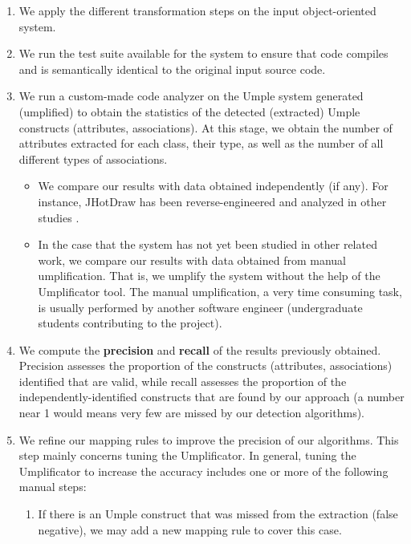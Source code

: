 \begin{enumerate}
\item We apply the different transformation steps on the input object-oriented system.

\item We run the test suite available for the system to ensure that code compiles and is semantically identical to the original input source code.

\item We run a custom-made code analyzer on the Umple system generated (umplified) to obtain the statistics of the detected (extracted) Umple constructs (attributes, associations). At this stage, we obtain the number of attributes extracted for each class, their type, as well as the number of all different types of associations.	

	\begin{itemize}
		\item We compare our results with data obtained independently (if any). For instance, JHotDraw has been reverse-engineered and analyzed in other studies \cite{Gueheneuc}. 
		
		\item In the case that the system has not yet been studied in other related work, we 				compare our results with data obtained from manual umplification. That is, we umplify the system without the help of the Umplificator tool. The manual 	umplification, a very time consuming task, is usually performed by another software engineer (undergraduate 			students contributing to the project).
	\end{itemize}
	
\item We compute the \textbf{precision} and \textbf{recall} of the results previously obtained. Precision assesses the proportion of the constructs (attributes, associations) identified that are valid, while recall assesses the proportion of the independently-identified constructs that are found by our approach (a number near 1 would means very few are missed by our detection algorithms). 

\item We refine our mapping rules to improve the precision of our algorithms. This step mainly concerns  tuning the Umplificator. In general, tuning the Umplificator to increase the accuracy includes one or more of the following manual steps:

	\begin{enumerate}
		\item If there is an Umple construct that was missed from the extraction (false negative), we may add a new mapping rule to cover this case.
		

\end{enumerate}
\end{enumerate}
